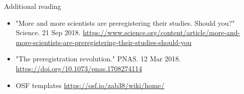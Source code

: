 \documentclass[xcolor={dvipsnames},handout]{beamer}
\begin{document}
\begin{frame}{Additional reading}

\begin{itemize}
\item "More and more scientists are preregistering their studies. Should you?" Science. 21 Sep 2018. \url{https://www.science.org/content/article/more-and-more-scientists-are-preregistering-their-studies-should-you}
\item "The preregistration revolution." PNAS. 12 Mar 2018. \url{https://doi.org/10.1073/pnas.1708274114}
\item OSF templates \url{https://osf.io/zab38/wiki/home/}
\end{itemize}

\end{frame}



\end{document}
